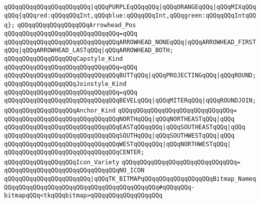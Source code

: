\verb|qQQqqQQqqQQqqQQqqQQqqQQq|\verb#|qQQqPURPLEqQQqqQQq|qQQqORANGEqQQq|qQQqMIXqQQqqQQq{qQQqred:qQQqqQQqInt,qQQqblue:qQQqqQQqInt,qQQqgreen:qQQqqQQqIntqQQq};#\newline
\newline
\verb|qQQqqQQqqQQqqQQqqQQqArrowhead_Pos|\newline
\verb|qQQqqQQqqQQqqQQqqQQqqQQqqQQqqQQq=qQQq|\newline
\verb|qQQqqQQqqQQqqQQqqQQqqQQqqQQqqQQqARROWHEAD_NONEqQQq|\verb#|qQQqARROWHEAD_FIRSTqQQq|qQQqARROWHEAD_LASTqQQq|qQQqARROWHEAD_BOTH;#\newline
\newline
\verb|qQQqqQQqqQQqqQQqqQQqCapstyle_Kind|\newline
\verb|qQQqqQQqqQQqqQQqqQQqqQQqqQQqqQQq=qQQq|\newline
\verb|qQQqqQQqqQQqqQQqqQQqqQQqqQQqqQQqBUTTqQQq|\verb#|qQQqPROJECTINGqQQq|qQQqROUND;#\newline
\newline
\verb|qQQqqQQqqQQqqQQqqQQqJoinstyle_Kind|\newline
\verb|qQQqqQQqqQQqqQQqqQQqqQQqqQQqqQQq=qQQq|\newline
\verb|qQQqqQQqqQQqqQQqqQQqqQQqqQQqqQQqBEVELqQQq|\verb#|qQQqMITERqQQq|qQQqROUNDJOIN;#\newline
\newline
\verb|qQQqqQQqqQQqqQQqqQQqAnchor_Kind|\newline
\verb|qQQqqQQqqQQqqQQqqQQqqQQqqQQqqQQq=|\newline
\verb|qQQqqQQqqQQqqQQqqQQqqQQqqQQqqQQqNORTHqQQq|\verb#|qQQqNORTHEASTqQQq|qQQq#\newline
\verb|qQQqqQQqqQQqqQQqqQQqqQQqqQQqqQQqEASTqQQqqQQq|\verb#|qQQqSOUTHEASTqQQq|qQQq#\newline
\verb|qQQqqQQqqQQqqQQqqQQqqQQqqQQqqQQqSOUTHqQQq|\verb#|qQQqSOUTHWESTqQQq|qQQq#\newline
\verb|qQQqqQQqqQQqqQQqqQQqqQQqqQQqqQQqWESTqQQqqQQq|\verb#|qQQqNORTHWESTqQQq|#\newline
\verb|qQQqqQQqqQQqqQQqqQQqqQQqqQQqqQQqCENTER;|\newline
\newline
\verb|qQQqqQQqqQQqqQQqqQQqIcon_Variety|\newline
\verb|qQQqqQQqqQQqqQQqqQQqqQQqqQQqqQQq=|\newline
\verb|qQQqqQQqqQQqqQQqqQQqqQQqqQQqqQQqNO_ICON|\newline
\verb|qQQqqQQqqQQqqQQqqQQqqQQq|\verb#|qQQqTK_BITMAPqQQqqQQqqQQqqQQqqQQqBitmap_NameqQQqqQQqqQQqqQQqqQQqqQQqqQQqqQQqqQQqqQQqqQQq#\verb|#qQQqqQQq-bitmapqQQq<tkqQQqbitmap>qQQqqQQqqQQqqQQqqQQq|\newline
